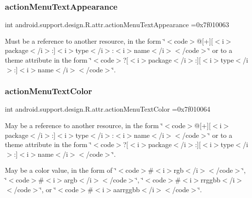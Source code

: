 \subsubsection{\texorpdfstring{action\+Menu\+Text\+Appearance}{actionMenuTextAppearance}}
{\footnotesize\ttfamily int android.\+support.\+design.\+R.\+attr.\+action\+Menu\+Text\+Appearance =0x7f010063\hspace{0.3cm}{\ttfamily [static]}}

Must be a reference to another resource, in the form \char`\"{}$<$code$>$@\mbox{[}+\mbox{]}\mbox{[}$<$i$>$package$<$/i$>$\+:\mbox{]}$<$i$>$type$<$/i$>$\+:$<$i$>$name$<$/i$>$$<$/code$>$\char`\"{} or to a theme attribute in the form \char`\"{}$<$code$>$?\mbox{[}$<$i$>$package$<$/i$>$\+:\mbox{]}\mbox{[}$<$i$>$type$<$/i$>$\+:\mbox{]}$<$i$>$name$<$/i$>$$<$/code$>$\char`\"{}. \mbox{\label{classandroid_1_1support_1_1design_1_1R_1_1attr_aa57a8ae5add076494a575c2c4bd55adb}} 
\subsubsection{\texorpdfstring{action\+Menu\+Text\+Color}{actionMenuTextColor}}
{\footnotesize\ttfamily int android.\+support.\+design.\+R.\+attr.\+action\+Menu\+Text\+Color =0x7f010064\hspace{0.3cm}{\ttfamily [static]}}

May be a reference to another resource, in the form \char`\"{}$<$code$>$@\mbox{[}+\mbox{]}\mbox{[}$<$i$>$package$<$/i$>$\+:\mbox{]}$<$i$>$type$<$/i$>$\+:$<$i$>$name$<$/i$>$$<$/code$>$\char`\"{} or to a theme attribute in the form \char`\"{}$<$code$>$?\mbox{[}$<$i$>$package$<$/i$>$\+:\mbox{]}\mbox{[}$<$i$>$type$<$/i$>$\+:\mbox{]}$<$i$>$name$<$/i$>$$<$/code$>$\char`\"{}. 

May be a color value, in the form of \char`\"{}$<$code$>$\#$<$i$>$rgb$<$/i$>$$<$/code$>$\char`\"{}, \char`\"{}$<$code$>$\#$<$i$>$argb$<$/i$>$$<$/code$>$\char`\"{}, \char`\"{}$<$code$>$\#$<$i$>$rrggbb$<$/i$>$$<$/code$>$\char`\"{}, or \char`\"{}$<$code$>$\#$<$i$>$aarrggbb$<$/i$>$$<$/code$>$\char`\"{}. \mbox{\label{classandroid_1_1support_1_1design_1_1R_1_1attr_a25ba85cbbc94b7b1a638506bcd7914df}} 
